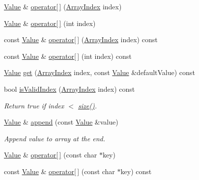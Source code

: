 \begin{DoxyCompactItemize}
\hyperlink{class_json_1_1_value}{Value} \& \hyperlink{class_json_1_1_value_a7d99f5dba388cdaa152ce6ef933d64ef}{operator\mbox{[}$\,$\mbox{]}} (\hyperlink{class_json_1_1_value_a184a91566cccca7b819240f0d5561c7d}{Array\+Index} index)
\item 
\hyperlink{class_json_1_1_value}{Value} \& \hyperlink{class_json_1_1_value_ac9182982c361e0ab621134d406e5f250}{operator\mbox{[}$\,$\mbox{]}} (int index)
\item 
const \hyperlink{class_json_1_1_value}{Value} \& \hyperlink{class_json_1_1_value_a46607236038b29695ed80c15895271e4}{operator\mbox{[}$\,$\mbox{]}} (\hyperlink{class_json_1_1_value_a184a91566cccca7b819240f0d5561c7d}{Array\+Index} index) const
\item 
const \hyperlink{class_json_1_1_value}{Value} \& \hyperlink{class_json_1_1_value_a0b42557a95621a4676b46a21ffc5e949}{operator\mbox{[}$\,$\mbox{]}} (int index) const
\item 
\hyperlink{class_json_1_1_value}{Value} \hyperlink{class_json_1_1_value_a034eb7bf85a44fa759bdaa232788ca66}{get} (\hyperlink{class_json_1_1_value_a184a91566cccca7b819240f0d5561c7d}{Array\+Index} index, const \hyperlink{class_json_1_1_value}{Value} \&default\+Value) const
\item 
bool \hyperlink{class_json_1_1_value_ac2928f174a6e081c1500c28c2d61ee93}{is\+Valid\+Index} (\hyperlink{class_json_1_1_value_a184a91566cccca7b819240f0d5561c7d}{Array\+Index} index) const
\begin{DoxyCompactList}\small\item\em Return true if index $<$ \hyperlink{class_json_1_1_value_a0ec2808e1d7efa4e9fad938d6667be44}{size()}. \end{DoxyCompactList}\item 
\hyperlink{class_json_1_1_value}{Value} \& \hyperlink{class_json_1_1_value_a7e49ac977e4bcf59745a09d426669f75}{append} (const \hyperlink{class_json_1_1_value}{Value} \&value)
\begin{DoxyCompactList}\small\item\em Append value to array at the end. \end{DoxyCompactList}\item 
\hyperlink{class_json_1_1_value}{Value} \& \hyperlink{class_json_1_1_value_acb912f4ec40a25ea6eb387730885f3d9}{operator\mbox{[}$\,$\mbox{]}} (const char $\ast$key)
\item 
const \hyperlink{class_json_1_1_value}{Value} \& \hyperlink{class_json_1_1_value_a1b0498b7b2a520a68137f682d91abdd5}{operator\mbox{[}$\,$\mbox{]}} (const char $\ast$key) const

\end{DoxyCompactItemize}
